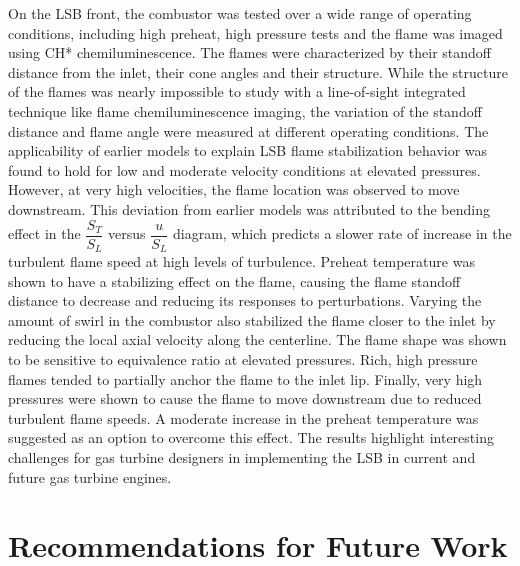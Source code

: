 On the LSB front, the combustor was tested over a wide range of operating conditions, including high preheat, high pressure tests and the flame was imaged using CH* chemiluminescence.
The flames were characterized by their standoff distance from the inlet, their cone angles and their structure.
While the structure of the flames was nearly impossible to study with a line-of-sight integrated technique like flame chemiluminescence imaging, the variation of the standoff distance and flame angle were measured at different operating conditions.
The applicability of earlier models to explain LSB flame stabilization behavior was found to hold for low and moderate velocity conditions at elevated pressures.
However, at very high velocities, the flame location was observed to move downstream.
This deviation from earlier models was attributed to the bending effect in the \(\dfrac{ S_T }{ S_L }\) versus \(\dfrac{ u }{ S_L}\) diagram, which predicts a slower rate of increase in the turbulent flame speed at high levels of turbulence.
Preheat temperature was shown to have a stabilizing effect on the flame, causing the flame standoff distance to decrease and reducing its responses to perturbations.
Varying the amount of swirl in the combustor also stabilized the flame closer to the inlet by reducing the local axial velocity along the centerline.
The flame shape was shown to be sensitive to equivalence ratio at elevated pressures.
Rich, high pressure flames tended to partially anchor the flame to the inlet lip.
Finally, very high pressures were shown to cause the flame to move downstream due to reduced turbulent flame speeds.
A moderate increase in the preheat temperature was suggested as an option to overcome this effect.
The results highlight interesting challenges for gas turbine designers in implementing the LSB in current and future gas turbine engines. 

\section{Recommendations for Future Work}

